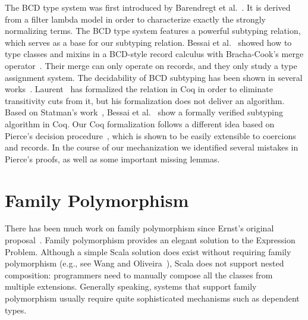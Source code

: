 The BCD type system was first introduced by Barendregt et al.~\citep{Barendregt_1983}. It is
derived from a filter lambda model in order to characterize exactly the strongly
normalizing terms. The BCD type system features a powerful subtyping relation,
which serves as a base for our subtyping relation. Bessai et al.~\citep{DBLP:journals/corr/BessaiDDCd15}
showed how to type classes and mixins in a BCD-style record calculus with Bracha-Cook's merge operator~\citep{bracha1990mixin}.
Their merge can only operate on records, and they only study a type assignment system.
The decidability of BCD subtyping has been shown in several
works~\citep{pierce1989decision, Kurata_1995, Rehof_2011, Statman_2015}.
Laurent~\citep{laurent2012intersection} has formalized the relation in Coq in
order to eliminate transitivity cuts from it, but his formalization does not
deliver an algorithm. Based on Statman's work~\citep{Statman_2015}, Bessai et
al.~\citep{bessaiextracting} show a formally verified subtyping algorithm in Coq.
Our Coq formalization follows a different idea based on Pierce's decision
procedure~\citep{pierce1989decision}, which is shown to be easily extensible to
coercions and records. In the course of our mechanization we identified several
mistakes in Pierce's proofs, as well as some important missing lemmas.

\section{Family Polymorphism}

There has been much work on family polymorphism since Ernst's
original proposal~\citep{Ernst_2001}. Family polymorphism provides an elegant
solution to the Expression Problem. Although a simple Scala solution does exist without
requiring family polymorphism (e.g., see Wang and Oliveira~\citep{wang2016expression}), Scala
does not support nested composition: programmers need to manually compose
all the classes from multiple extensions. Generally speaking, systems that support
family polymorphism usually require quite sophisticated mechanisms such as
dependent types.


